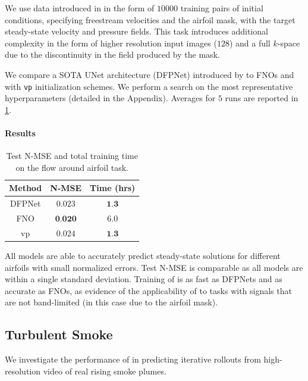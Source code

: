 We use data introduced in \citep{thuerey2020deep} in the form of $10000$ training pairs of initial conditions, specifying freestream velocities and the airfoil mask, with the target steady-state velocity and pressure fields. This task introduces additional complexity in the form of higher resolution input images ($128$) and a full $k$-space due to the discontinuity in the field produced by the mask. 

We compare a SOTA UNet architecture (DFPNet) introduced by \citep{thuerey2020deep} to FNOs and \ourmethod{} with {\tt vp} initialization schemes. We perform a search on the most representative hyperparameters (detailed in the Appendix). Averages for $5$ runs are reported in \cref{tab:dfp}.

\paragraph{Results}

\begin{table}
    \vspace{-2mm}
    \centering
    \begin{tabular}{c|c|c}\toprule
        \textbf{Method} & N-MSE & Time (hrs) \\
        \midrule
        DFPNet & $0.023$ & $\textbf{1.3}$\\ 
        FNO & $\textbf{0.020}$ & $6.0$\\ 
        \rowcolor{blue!4}
        \ourmethod{+}vp & $0.024$ & $\textbf{1.3}$\\
    \end{tabular}
    \vspace{-0.2mm}
    \caption{\small Test N-MSE and total training time on the flow around airfoil task.}
    \label{tab:dfp}
\end{table}

All models are able to accurately predict steady-state solutions for different airfoils with small normalized errors. Test N-MSE is comparable as all models are within a single standard deviation. Training of \ourmethod{} is as fast as DFPNets \citep{thuerey2020deep} and as accurate as FNOs, as evidence of the applicability of \ourmethod{} to tasks with signals that are not band-limited (in this case due to the airfoil mask).


\clearpage

\subsection{Turbulent Smoke}\label{subsec:scal}
We investigate the performance of \ourmethod{} in predicting iterative rollouts from high-resolution video of real rising smoke plumes.

